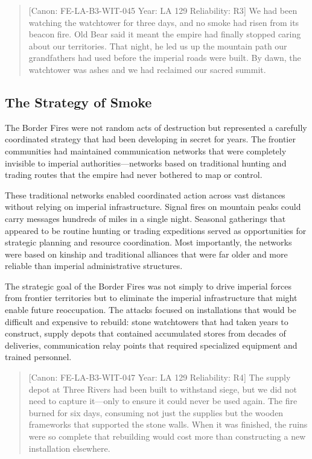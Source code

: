 \begin{quote}
{[}Canon: FE-LA-B3-WIT-045 \textbar{} Year: LA 129 \textbar{}
Reliability: R3{]} We had been watching the watchtower for three days,
and no smoke had risen from its beacon fire. Old Bear said it meant the
empire had finally stopped caring about our territories. That night, he
led us up the mountain path our grandfathers had used before the
imperial roads were built. By dawn, the watchtower was ashes and we had
reclaimed our sacred summit.
\end{quote}

\subsection{The Strategy of Smoke}\label{the-strategy-of-smoke}

The Border Fires were not random acts of destruction but represented a
carefully coordinated strategy that had been developing in secret for
years. The frontier communities had maintained communication networks
that were completely invisible to imperial authorities---networks based
on traditional hunting and trading routes that the empire had never
bothered to map or control.

These traditional networks enabled coordinated action across vast
distances without relying on imperial infrastructure. Signal fires on
mountain peaks could carry messages hundreds of miles in a single night.
Seasonal gatherings that appeared to be routine hunting or trading
expeditions served as opportunities for strategic planning and resource
coordination. Most importantly, the networks were based on kinship and
traditional alliances that were far older and more reliable than
imperial administrative structures.

The strategic goal of the Border Fires was not simply to drive imperial
forces from frontier territories but to eliminate the imperial
infrastructure that might enable future reoccupation. The attacks
focused on installations that would be difficult and expensive to
rebuild: stone watchtowers that had taken years to construct, supply
depots that contained accumulated stores from decades of deliveries,
communication relay points that required specialized equipment and
trained personnel.

\begin{quote}
{[}Canon: FE-LA-B3-WIT-047 \textbar{} Year: LA 129 \textbar{}
Reliability: R4{]} The supply depot at Three Rivers had been built to
withstand siege, but we did not need to capture it---only to ensure it
could never be used again. The fire burned for six days, consuming not
just the supplies but the wooden frameworks that supported the stone
walls. When it was finished, the ruins were so complete that rebuilding
would cost more than constructing a new installation elsewhere.
\end{quote}

